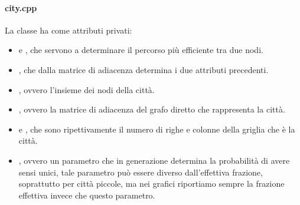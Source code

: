 \documentclass[main.tex]{subfiles}
\begin{document}
    \paragraph{city.cpp}
        La classe  ha come attributi privati:
        \begin{itemize}
            \item {} e , che servono a determinare il percorso più efficiente tra due nodi.
            \item {}, che dalla matrice di adiacenza determina i due attributi precedenti.
            \item {}, ovvero l'insieme dei nodi della città.
            \item {}, ovvero la matrice di adiacenza del grafo diretto che rappresenta la città.
            \item {} e , che sono ripettivamente il numero di righe e colonne della griglia che è la città.
            \item {}, ovvero un parametro che in generazione determina la probabilità di avere sensi unici,
                tale parametro può essere diverso dall'effettiva frazione, soprattutto per città piccole, ma nei grafici riportiamo sempre la 
                frazione effettiva invece che questo parametro.
        \end{itemize}
\end{document}

